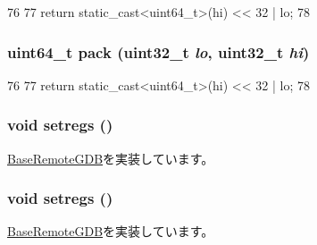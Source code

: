 \begin{DoxyCode}
76         {
77             return static_cast<uint64_t>(hi) << 32 | lo;
78         }
\end{DoxyCode}
\hypertarget{classMipsISA_1_1RemoteGDB_ab949ca65737c1211d9722edae7e87391}{
\subsubsection[{pack}]{\setlength{\rightskip}{0pt plus 5cm}uint64\_\-t pack ({\bf uint32\_\-t} {\em lo}, \/  {\bf uint32\_\-t} {\em hi})}}
\label{classMipsISA_1_1RemoteGDB_ab949ca65737c1211d9722edae7e87391}



\begin{DoxyCode}
76         {
77             return static_cast<uint64_t>(hi) << 32 | lo;
78         }
\end{DoxyCode}
\hypertarget{classMipsISA_1_1RemoteGDB_a2051121b6bc93c8ca3856bbeeca7bdc1}{
\subsubsection[{setregs}]{\setlength{\rightskip}{0pt plus 5cm}void setregs ()}}
\label{classMipsISA_1_1RemoteGDB_a2051121b6bc93c8ca3856bbeeca7bdc1}


\hyperlink{classBaseRemoteGDB_a6b0b51dc196f12756cc0ec49a3ae6a6a}{BaseRemoteGDB}を実装しています。\hypertarget{classMipsISA_1_1RemoteGDB_a2051121b6bc93c8ca3856bbeeca7bdc1}{
\subsubsection[{setregs}]{\setlength{\rightskip}{0pt plus 5cm}void setregs ()}}
\label{classMipsISA_1_1RemoteGDB_a2051121b6bc93c8ca3856bbeeca7bdc1}


\hyperlink{classBaseRemoteGDB_a6b0b51dc196f12756cc0ec49a3ae6a6a}{BaseRemoteGDB}を実装しています。


